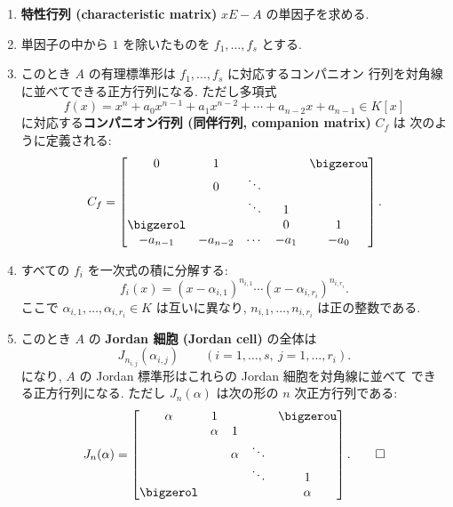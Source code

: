 \documentclass[12pt,twoside]{jarticle}
\begin{document}
\begin{enumerate}
\item {\bf 特性行列 (characteristic matrix)} $xE-A$ の単因子を求める.
\item 単因子の中から $1$ を除いたものを $f_1,\dots,f_s$ とする.
\item このとき $A$ の有理標準形は $f_1,\dots,f_s$ に対応するコンパニオン
  行列を対角線に並べてできる正方行列になる.  ただし多項式
  \begin{equation*}
    f(x) = x^n + a_0x^{n-1} + a_1x^{n-2} + \cdots + a_{n-2}x + a_{n-1}
    \in K[x]
  \end{equation*}
  に対応する{\bf コンパニオン行列 (同伴行列, companion matrix)} $C_f$ は
  次のように定義される:
  \begin{equation*}
    C_f = 
    \begin{bmatrix}
      0         &    1     &        &      & \bigzerou \\
                &    0     & \ddots &      & \\
                &          & \ddots &  1   & \\
      \bigzerol &          &        &  0   &  1 \\
      -a_{n-1}  & -a_{n-2} & \cdots & -a_1 & -a_0 \\
    \end{bmatrix}.
  \end{equation*}
\item すべての $f_i$ を一次式の積に分解する:
  \begin{equation*}
    f_i(x) = (x-\alpha_{i,1})^{n_{i,1}}\cdots(x-\alpha_{i,r_i})^{n_{i,r_i}}.
  \end{equation*}
  ここで $\alpha_{i,1},\dots,\alpha_{i,r_i}\in K$ は互いに異なり,
  $n_{i,1},\dots,n_{i,r_i}$ は正の整数である.
\item このとき $A$ の {\bf Jordan 細胞 (Jordan cell)} の全体は
  \begin{equation*}
    J_{n_{i,j}}(\alpha_{i,j})
    \qquad
    (i=1,\dots,s,\ j=1,\dots,r_i).
  \end{equation*}
  になり,  $A$ の Jordan 標準形はこれらの Jordan 細胞を対角線に並べて
  できる正方行列になる.
  ただし $J_n(\alpha)$ は次の形の $n$ 次正方行列である:
  \begin{equation*}
    J_n(\alpha) = 
    \begin{bmatrix}
      \alpha &    1   &        &        & \bigzerou \\
             & \alpha &    1   &        & \\
             &        & \alpha & \ddots & \\
             &        &        & \ddots & 1 \\
      \bigzerol &     &        &        & \alpha \\
    \end{bmatrix}.
    \qed
  \end{equation*}
\end{enumerate}
\end{document}
